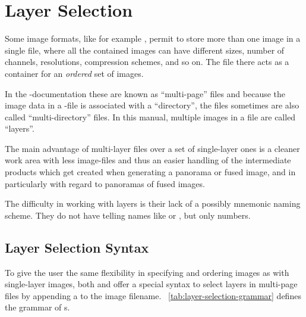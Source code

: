 

\section[Layer Selection\commonpart]{\label{sec:layer-selection}%
  Layer Selection\commonpart}

Some image formats, like for example , permit to store more than one image in a
single file, where all the contained images can have different sizes, number of channels,
resolutions, compression schemes, and so on.  The file there acts as a container for an
\emph{ordered} set of images.

%
%
%
%
%
In the -documentation these are known as ``multi-page'' files and because the
image data in a -file is associated with a ``directory'', the files sometimes are
also called ``multi-directory'' files.  In this manual, multiple images in a file are called
``layers''.

The main advantage of multi-layer files over a set of single-layer ones is a cleaner work area
with less image-files and thus an easier handling of the intermediate products which get created
when generating a panorama or fused image, and in particularly with regard to panoramas of fused
images.

The difficulty in working with layers is their lack of a possibly mnemonic naming scheme.  They
do not have telling names like  or , but only
numbers.


\subsection[Layer Selection Syntax]{\label{sec:layer-selection-syntax}%
  Layer Selection Syntax}

To give the user the same flexibility in specifying and ordering images as with single-layer
images, both \App{} and \OtherApp{} offer a special syntax to select layers in multi-page files
by appending a  to the image filename.
\tableName~\ref{tab:layer-selection-grammar} defines the grammar of
\/s.

